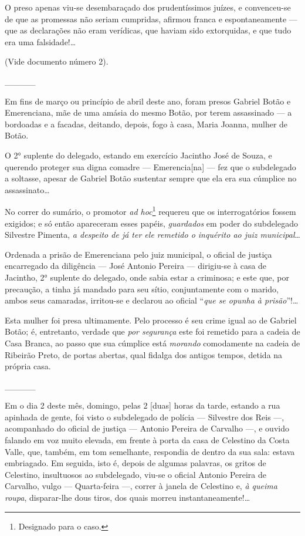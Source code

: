 O preso apenas viu-se desembaraçado dos prudentíssimos juízes, e
convenceu-se de que as promessas não seriam cumpridas, afirmou franca e
espontaneamente --- que as declarações não eram verídicas, que haviam
sido extorquidas, e que tudo era uma falsidade!\ldots{}

(Vide documento número 2).

\_\_\_\_\_

Em fins de março ou princípio de abril deste ano, foram presos Gabriel
Botão e Emerenciana, mãe de uma amásia do mesmo Botão, por terem
assassinado --- a bordoadas e a facadas, deitando, depois, fogo à casa,
Maria Joanna, mulher de Botão.

O 2° suplente do delegado, estando em exercício Jacintho José de Souza,
e querendo proteger sua digna comadre --- Emerencia{[}na{]} --- fez que o
subdelegado a soltasse, apesar de Gabriel Botão sustentar sempre que ela
era sua cúmplice no assassinato\ldots{}

\noindent\dotfill{}

No correr do sumário, o promotor \emph{ad hoc}\footnote{ Designado para
  o caso.} requereu que os interrogatórios fossem exigidos; e só então
apareceram esses papéis, \emph{guardados} em poder do subdelegado
Silvestre Pimenta, \emph{a despeito de já ter ele remetido o inquérito
ao juiz municipal}\ldots{}

Ordenada a prisão de Emerenciana pelo juiz municipal, o oficial de
justiça encarregado da diligência --- José Antonio Pereira --- dirigiu-se
à casa de Jacintho, 2° suplente do delegado, onde sabia estar a
criminosa; e este que, por precaução, a tinha já mandado para seu sítio,
conjuntamente com o marido, ambos seus camaradas, irritou-se e declarou
ao oficial ``\emph{que se opunha à prisão}''!\ldots{}

Esta mulher foi presa ultimamente. Pelo processo é seu crime igual ao de
Gabriel Botão; é, entretanto, verdade que \emph{por segurança} este foi
remetido para a cadeia de Casa Branca, ao passo que sua cúmplice está
\emph{morando} comodamente na cadeia de Ribeirão Preto, de portas
abertas, qual fidalga dos antigos tempos, detida na própria casa.

\_\_\_\_\_

Em o dia 2 deste mês, domingo, pelas 2 {[}duas{]} horas da tarde,
estando a rua apinhada de gente, foi visto o subdelegado de polícia ---
Silvestre dos Reis ---, acompanhado do oficial de justiça --- Antonio
Pereira de Carvalho ---, e ouvido falando em voz muito elevada, em frente
à porta da casa de Celestino da Costa Valle, que, também, em tom
semelhante, respondia de dentro da sua sala: estava embriagado. Em
seguida, isto é, depois de algumas palavras, os gritos de Celestino,
insultuosos ao subdelegado, viu-se o oficial Antonio Pereira de
Carvalho, vulgo --- Quarta-feira ---, correr à janela de Celestino e,
\emph{à queima roupa}, disparar-lhe dous tiros, dos quais morreu
instantaneamente!\ldots{}

